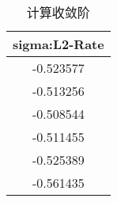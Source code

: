 \begin{table}[htb]
\caption{计算收敛阶}
\begin{tabular}{c}
\toprule
sigma:L2-Rate \\
\midrule
-0.523577 \\
-0.513256 \\
-0.508544 \\
-0.511455 \\
-0.525389 \\
-0.561435 \\
\bottomrule
\end{tabular}
\end{table}
